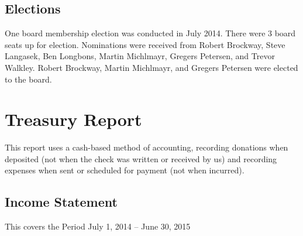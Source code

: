 \documentclass[letterpaper]{report}
\begin{document}
\section{Elections}

One board membership election was conducted in July 2014.  There were 3
board seats up for election.  Nominations were received from Robert
Brockway, Steve Langasek, Ben Longbons, Martin Michlmayr, Gregers
Petersen, and Trevor Walkley.  Robert Brockway, Martin Michlmayr, and
Gregers Petersen were elected to the board.

\chapter{Treasury Report}

This report uses a cash-based method of accounting, recording donations when
deposited (not when the check was written or received by us) and recording
expenses when sent or scheduled for payment (not when incurred).

\section{Income Statement}

This covers the Period July 1, 2014 -- June 30, 2015
\end{document}
